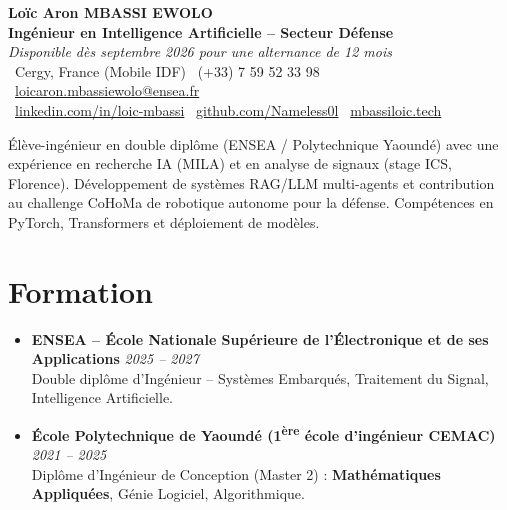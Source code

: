 \documentclass[a4paper,11pt]{article}
\begin{document}
\begin{center}
    {\Large \textbf{Loïc Aron MBASSI EWOLO}} \\ \vspace{4pt}
    \textbf{\large Ingénieur en Intelligence Artificielle -- Secteur Défense} \\
    \textit{\small Disponible dès septembre 2026 pour une alternance de 12 mois} \\ \vspace{4pt}
    \small
    \faMapMarker\ Cergy, France (Mobile IDF) \quad
    \faPhone\ (+33) 7 59 52 33 98 \quad
    \faEnvelope\ \href{mailto:loicaron.mbassiewolo@ensea.fr}{loicaron.mbassiewolo@ensea.fr} \\ \vspace{2pt}
    \faLinkedin\ \href{https://www.linkedin.com/in/loic-mbassi/}{linkedin.com/in/loic-mbassi} \quad
    \faGithub\ \href{https://github.com/Nameless0l}{github.com/Nameless0l} \quad
    \faGlobe\ \href{https://mbassiloic.tech}{mbassiloic.tech}
\end{center}

\vspace{-6pt}

\noindent\small{Élève-ingénieur en double diplôme (ENSEA / Polytechnique Yaoundé) avec une expérience en recherche IA (MILA) et en analyse de signaux (stage ICS, Florence). Développement de systèmes RAG/LLM multi-agents et contribution au challenge CoHoMa de robotique autonome pour la défense. Compétences en PyTorch, Transformers et déploiement de modèles.}

\section{Formation}
\begin{itemize}[leftmargin=*, label=\tiny$\bullet$, nosep]
    \item \textbf{ENSEA -- École Nationale Supérieure de l'Électronique et de ses Applications} \hfill \textit{2025 -- 2027} \\
    \small{Double diplôme d'Ingénieur -- Systèmes Embarqués, Traitement du Signal, Intelligence Artificielle.}
    \item \textbf{École Polytechnique de Yaoundé (1\textsuperscript{ère} école d'ingénieur CEMAC)} \hfill \textit{2021 -- 2025} \\
    \small{Diplôme d'Ingénieur de Conception (Master 2) : \textbf{Mathématiques Appliquées}, Génie Logiciel, Algorithmique.}
\end{itemize}
\end{document}
